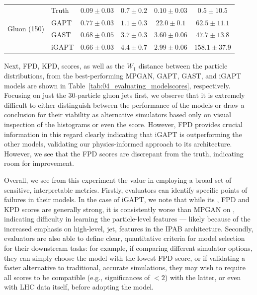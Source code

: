 \begin{table}[ht!]
{\begin{tabular}{l|lcccc}
        \multirow{4}{*}{Gluon (150)}
        & Truth & $0.09 \pm 0.03$ & $0.7 \pm 0.2$ & $0.10 \pm 0.03$ & $0.5 \pm 10.5$\\ 
        & GAPT & $0.77 \pm 0.03$ & $\mathbf{1.1 \pm 0.3}$ & $22.0 \pm 0.1$ & $62.5 \pm 11.1$\\ 
        & GAST & $0.68 \pm 0.05$ & $3.7 \pm 0.3$ & $3.60 \pm 0.06$ & $\mathbf{47.7 \pm 13.8}$\\ 
        & iGAPT & $\mathbf{0.66 \pm 0.03}$ & $4.4 \pm 0.7$ & $\mathbf{2.99 \pm 0.06}$ & $158.1 \pm 37.9$\\ 
        \bottomrule
    \end{tabular}
    }
\end{table}

Next, FPD, KPD, \wassm scores, as well as the $W_1$ distance between the particle \ptrel distributions, from the best-performing MPGAN, GAPT, GAST, and iGAPT models are shown in Table~\ref{tab:04_evaluating_modelscores}, respectively.
Focusing on just the 30-particle gluon jets first, we observe that it is extremely difficult to either distinguish between the performance of the models or draw a conclusion for their viability as alternative simulators based only on visual inspection of the histograms or even the \wassm score.
However, FPD provides crucial information in this regard clearly indicating that iGAPT is outperforming the other models, validating our physics-informed approach to its architecture.
However, we see that the FPD scores are discrepant from the truth, indicating room for improvement.

Overall, we see from this experiment the value in employing a broad set of sensitive, interpretable metrics.
Firstly, evaluators can identify specific points of failures in their models.
In the case of iGAPT, we note that while its \wassm, FPD and KPD scores are generally strong, it is consistently worse than MPGAN on \wassppt, indicating difficulty in learning the particle-level features --- likely because of the increased emphasis on high-level, jet, features in the IPAB architecture.
Secondly, evaluators are also able to define clear, quantitative criteria for model selection for their downstream tasks: for example, if comparing different simulator options, they can simply choose the model with the lowest FPD score, or if validating a faster alternative to traditional, accurate simulations, they may wish to require all scores to be compatible (e.g., significances of $<2$) with the latter, or even with LHC data itself, before adopting the model.

